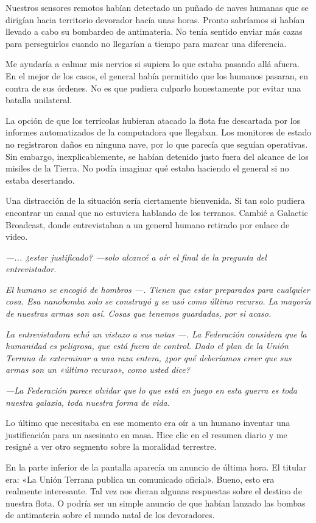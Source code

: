 Nuestros sensores remotos habían detectado un puñado de naves humanas que se dirigían hacia territorio devorador hacía unas horas. Pronto sabríamos si habían llevado a cabo su bombardeo de antimateria. No tenía sentido enviar más cazas para perseguirlos cuando no llegarían a tiempo para marcar una diferencia.

Me ayudaría a calmar mis nervios si supiera lo que estaba pasando allá afuera. En el mejor de los casos, el general había permitido que los humanos pasaran, en contra de sus órdenes. No es que pudiera culparlo honestamente por evitar una batalla unilateral.

La opción de que los terrícolas hubieran atacado la flota fue descartada por los informes automatizados de la computadora que llegaban. Los monitores de estado no registraron daños en ninguna nave, por lo que parecía que seguían operativas. Sin embargo, inexplicablemente, se habían detenido justo fuera del alcance de los misiles de la Tierra. No podía imaginar qué estaba haciendo el general si no estaba desertando.

Una distracción de la situación sería ciertamente bienvenida. Si tan solo pudiera encontrar un canal que no estuviera hablando de los terranos. Cambié a Galactic Broadcast, donde entrevistaban a un general humano retirado por enlace de video.

\textit{—... ¿estar justificado? —solo alcancé a oír el final de la pregunta del entrevistador.}

\textit{El humano se encogió de hombros —. Tienen que estar preparados para cualquier cosa. Esa nanobomba solo se construyó y se usó como último recurso. La mayoría de nuestras armas son así. Cosas que tenemos guardadas, por si acaso.}

\textit{La entrevistadora echó un vistazo a sus notas —. La Federación considera que la humanidad es peligrosa, que está fuera de control. Dado el plan de la Unión Terrana de exterminar a una raza entera, ¿por qué deberíamos creer que sus armas son un «último recurso», como usted dice?}

\textit{—La Federación parece olvidar que lo que está en juego en esta guerra es toda nuestra galaxia, toda nuestra forma de vida.}

Lo último que necesitaba en ese momento era oír a un humano inventar una justificación para un asesinato en masa. Hice clic en el resumen diario y me resigné a ver otro segmento sobre la moralidad terrestre.

En la parte inferior de la pantalla aparecía un anuncio de última hora. El titular era: «La Unión Terrana publica un comunicado oficial». Bueno, esto era realmente interesante. Tal vez nos dieran algunas respuestas sobre el destino de nuestra flota. O podría ser un simple anuncio de que habían lanzado las bombas de antimateria sobre el mundo natal de los devoradores.

